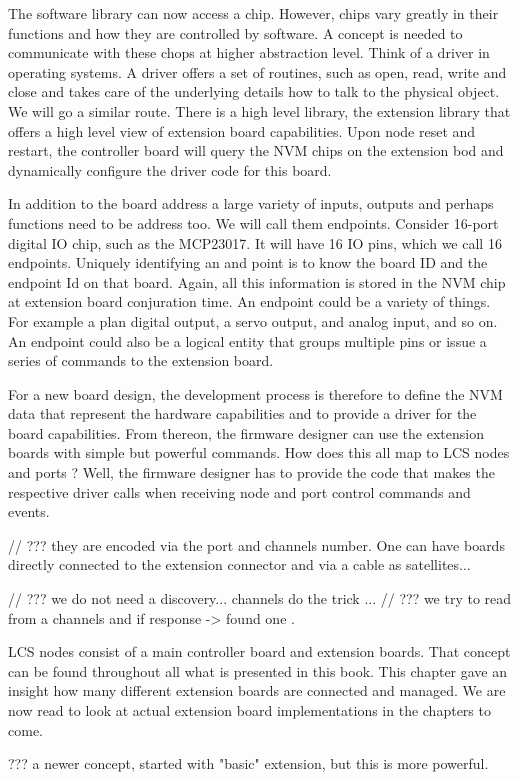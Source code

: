 The software library can now access a chip. However, chips vary greatly in their functions and how they are controlled by software. A concept is needed to communicate with these chops at  higher abstraction level. Think of a driver in operating systems. A driver offers a set of routines, such as open, read, write and close and takes care of the underlying details how to talk to the physical object. We will go a similar route. There is a high level library, the extension library that offers a high level view of extension board capabilities. Upon node reset and restart, the controller board will query the NVM chips on the extension bod and dynamically configure the driver code for this board.

In addition to the board address a large variety of inputs, outputs and perhaps functions need to be address too. We will call them endpoints. Consider  16-port digital IO chip, such as the MCP23017. It will have 16 IO pins, which we call 16 endpoints. Uniquely identifying an and point is to know the board ID and the endpoint Id on that board. Again, all this information is stored in the NVM  chip at extension board conjuration time. An endpoint could be a variety of things. For example a plan digital output, a servo output, and analog input, and so on. An endpoint could also be a logical entity that groups multiple pins or issue a series of commands to the extension board.

For a new board design, the development process is therefore to define the NVM data that represent the hardware capabilities  and to provide a driver for the board capabilities. From thereon, the firmware designer can use the extension boards with simple but powerful commands. How does this all map to LCS nodes and ports ? Well, the firmware designer has to provide the code that makes the respective driver calls when receiving node and port control commands and events.



// ??? they are encoded via the port and channels number. One can have boards directly connected to the extension connector and via a cable as satellites...



// ??? we do not need a discovery... channels do the trick ... 
// ??? we try to read from a channels and if response -> found one .




LCS nodes consist of a main controller board and extension boards. That concept can be found throughout all what is presented in this book. This chapter gave an insight how many different extension boards are connected and managed. We are now read to look at actual extension board implementations in the chapters to come.


??? a newer concept, started with "basic" extension, but this is more powerful.



